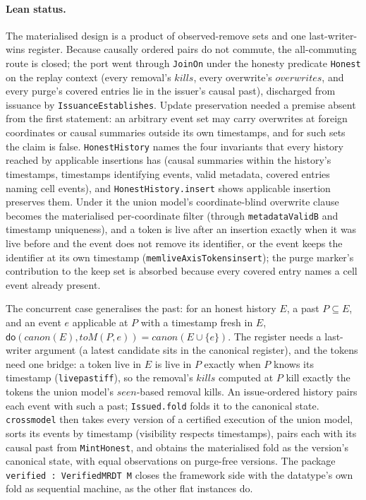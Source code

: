 \documentclass[11pt]{article}
\newcommand{\lean}[1]{\texttt{\def\_{\textunderscore\allowbreak}#1}}
\begin{document}
\paragraph{Lean status.} The materialised design is a product of
observed-remove sets and one last-writer-wins register. Because causally
ordered pairs do not commute, the all-commuting route is closed; the port
went through \lean{JoinOn} under the honesty predicate \lean{Honest} on the
replay context (every removal's $\mathit{kills}$, every overwrite's
$\mathit{overwrites}$, and every purge's covered entries lie in the issuer's
causal past), discharged from issuance by \lean{IssuanceEstablishes}.
Update preservation needed a premise absent from the first statement: an
arbitrary event set may carry overwrites at foreign coordinates or causal
summaries outside its own timestamps, and for such sets the claim is false.
\lean{HonestHistory} names the four invariants that every history reached by
applicable insertions has (causal summaries within the history's timestamps,
timestamps identifying events, valid metadata, covered entries naming cell
events), and \lean{HonestHistory.insert} shows applicable insertion preserves
them. Under it the union model's coordinate-blind overwrite clause becomes
the materialised per-coordinate filter (through \lean{metadataValidB} and
timestamp uniqueness), and a token is live after an insertion exactly when it
was live before and the event does not remove its identifier, or the event
keeps the identifier at its own timestamp
(\lean{mem\_liveAxisTokens\_insert}); the purge marker's contribution to the
keep set is absorbed because every covered entry names a cell event already
present.

The concurrent case generalises the past: for an honest history $E$, a
past $P \subseteq E$, and an event $e$ applicable at $P$ with a timestamp
fresh in $E$, $\mathsf{do}(\mathit{canon}(E), \mathit{toM}(P,e)) =
\mathit{canon}(E \cup \{e\})$. The register needs a last-writer argument (a
latest candidate sits in the canonical register), and the tokens need one
bridge: a token live in $E$ is live in $P$ exactly when $P$ knows its
timestamp (\lean{live\_past\_iff}), so the removal's $\mathit{kills}$
computed at $P$ kill exactly the tokens the union model's
$\mathit{seen}$-based removal kills. An issue-ordered history pairs each
event with such a past; \lean{Issued.fold} folds it to the canonical state.
\lean{cross\_model} then takes every version of a certified execution of the
union model, sorts its events by timestamp (visibility respects timestamps),
pairs each with its causal past from \lean{MintHonest}, and obtains the
materialised fold as the version's canonical state, with equal observations
on purge-free versions. The package \lean{verified : VerifiedMRDT M} closes
the framework side with the datatype's own fold as sequential machine, as
the other flat instances do.
\end{document}
